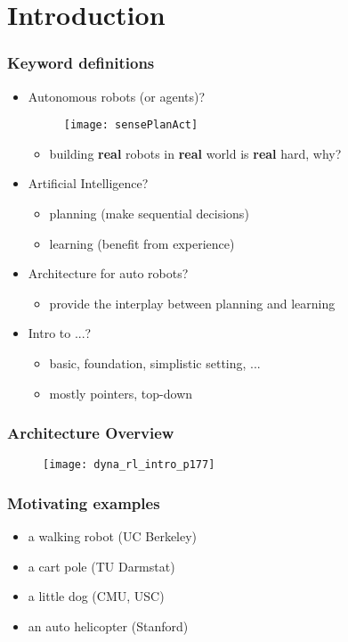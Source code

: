 \section{Introduction}

\begin{frame}
\frametitle{Keyword definitions}
\begin{itemize}
  \item Autonomous robots (or agents)? \pause
    \begin{figure}
      \centering
      \texttt{[image: sensePlanAct]}
    \end{figure}
    \pause
  \begin{itemize}
    \item building \textbf{real} robots in \textbf{real} world is \textbf{real} hard, why?
  \end{itemize}
  \pause

  \item Artificial Intelligence? \pause
  \begin{itemize}
    \item planning (make sequential decisions) \pause
    \item learning (benefit from experience)
  \end{itemize}
  \pause

  \item Architecture for auto robots?
  \begin{itemize}
    \item provide the interplay between planning and learning
  \end{itemize}
  \pause

  \item Intro to ...?
  \begin{itemize}
    \item basic, foundation, simplistic setting, ...
    \item mostly pointers, top-down
  \end{itemize}
\end{itemize}
\end{frame}

\begin{frame}
\frametitle{Architecture Overview}
\begin{figure}
    \centering
    \texttt{[image: dyna\_rl\_intro\_p177]}
\end{figure}
\end{frame}

\begin{frame}
\frametitle{Motivating examples}
\begin{itemize}
  \item a walking robot (UC Berkeley)
  \item a cart pole (TU Darmstat)
  \item a little dog (CMU, USC)
  \item an auto helicopter (Stanford)
\end{itemize}
\end{frame}
